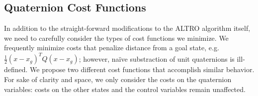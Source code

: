 \documentclass[letterpaper, 10 pt, conference]{ieeeconf}  %
\newcommand{\half}{\frac{1}{2}}
\begin{document}
    \subsection{Quaternion Cost Functions} \label{sec:cost_functions}
        In addition to the straight-forward modifications to the ALTRO algorithm itself, we
        need to carefully consider the types of cost functions we minimize. We frequently
        minimize costs that penalize distance from a goal state, e.g. $\half (x-x_g)^T Q
        (x-x_g)$; however, na\"ive substraction of unit quaternions is ill-defined. We
        propose two different cost functions that accomplish similar behavior.
        For sake of clarity and space, we only consider the costs on the quaternion
        variables: costs on the other states and the control variables remain unaffected.
        
\end{document}
